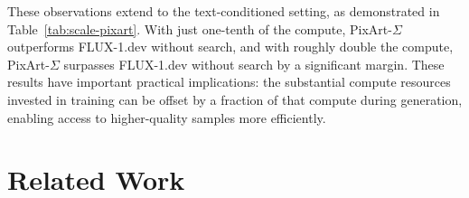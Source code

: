 \begin{table}
\centering
{}
\caption{\footnotesize{\textbf{\emph{Comparison between PixArt-$\Sigma$ when search with Verifier Ensemble and FLUX without search.}}} We use the total compute consumed by FLUX to generate one sample as the standard unit and scale the compute used by PixArt-$\Sigma$ accordingly. These total compute estimates are based on our best approximation and may not be entirely precise.}
\label{tab:scale-pixart}
\vspace{-0.5cm}
\end{table} 


These observations extend to the text-conditioned setting, as demonstrated in Table~\ref{tab:scale-pixart}. With just one-tenth of the compute, PixArt-$\Sigma$ outperforms FLUX-1.dev without search, and with roughly double the compute, PixArt-$\Sigma$ surpasses FLUX-1.dev without search by a significant margin. These results have important practical implications: the substantial compute resources invested in training can be offset by a fraction of that compute during generation, enabling access to higher-quality samples more efficiently.

\vspace{-0.25cm}
\section{Related Work}

